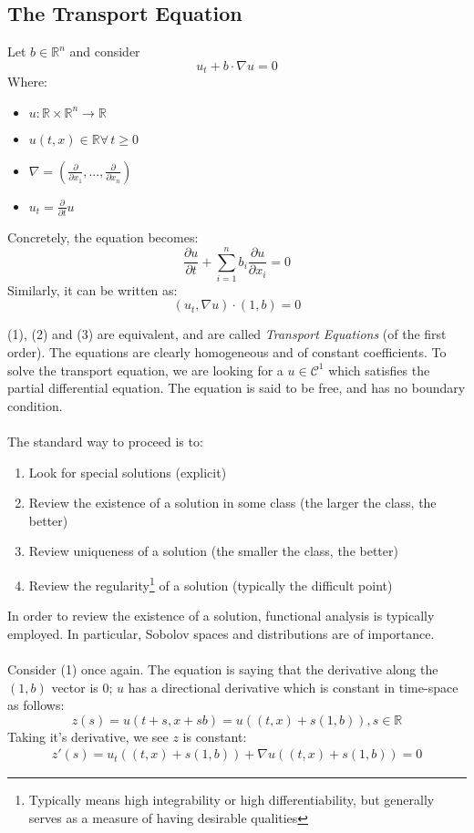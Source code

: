 \documentclass[12pt]{article}
\begin{document}
\subsection{The Transport Equation}
\label{sub:the_transport_equation}
Let $b\in\mathbb{R}^{n}$ and consider
\begin{equation}
u_t+b\cdot \nabla u=0   
\end{equation}
Where:
\begin{itemize}
    \item $u:\mathbb{R}\times\mathbb{R}^{n}\to \mathbb{R}$
    \item $u(t,x)\in\mathbb{R} \forall\, t\ge 0$
    \item $\nabla =(\frac{\partial}{\partial x_1},...,\frac{\partial}{\partial x_n})$
    \item $u_t=\frac{\partial }{\partial t}u$
\end{itemize}
Concretely, the equation becomes:
\begin{equation}
    \frac{\partial u}{\partial t}+\sum_{i=1}^n b_i\frac{\partial u}{\partial x_i}=0 
\end{equation}
Similarly, it can be written as:
\begin{equation}
    (u_t, \nabla u)\cdot(1,b)=0
\end{equation}

(1), (2) and (3) are equivalent, and are called \emph{Transport Equations} (of the first order). 
The equations are clearly homogeneous and of constant coefficients. 
To solve the transport equation, we are looking for a $u\in\mathcal{C}^{1}$ which satisfies the partial differential equation. 
The equation is said to be free, and has no boundary condition.
\\\\
The standard way to proceed is to:
\begin{enumerate}
    \item Look for special solutions (explicit)
    \item Review the existence of a solution in some class (the larger the class, the better)
    \item Review uniqueness of a solution (the smaller the class, the better)
    \item Review the regularity\footnote{Typically means high integrability or high differentiability, but generally serves as a measure of having desirable qualities} of a solution (typically the difficult point)
\end{enumerate}
In order to review the existence of a solution, functional analysis is typically employed. In particular, Sobolov spaces and distributions are of importance.\\\\
Consider (1) once again. The equation is saying that the derivative along the $(1,b)$ vector is 0; $u$ has a directional derivative which is constant in time-space as follows:
\begin{equation}
    z(s)=u(t+s,x+sb)=u((t,x)+s(1,b)), s\in\mathbb{R}
\end{equation}
Taking it's derivative, we see $z$ is constant:
\begin{gather*}
    z'(s)=u_t((t,x)+s(1,b))+\nabla u((t,x)+s(1,b))=0
\end{gather*}
\end{document}
